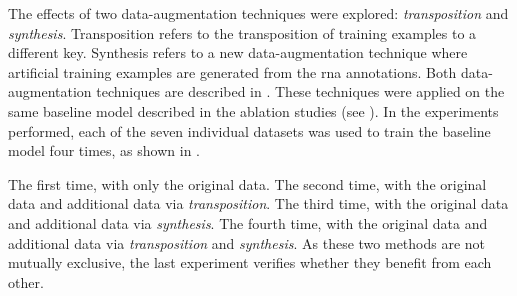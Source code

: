 
The effects of two data-augmentation techniques were
explored: \emph{transposition} and \emph{synthesis}.
Transposition refers to the transposition of training
examples to a different key. Synthesis refers to a new
data-augmentation technique where artificial training
examples are generated from the \gls{rna} annotations. Both
data-augmentation techniques are described in
. These techniques were applied on
the same baseline model described in the ablation studies
(see ). In the experiments
performed, each of the seven individual datasets was used to
train the baseline model four times, as shown in
. 


The first time, with only
the original data. The second time, with the original data
and additional data via \emph{transposition}. The third
time, with the original data and additional data via
\emph{synthesis}. The fourth time, with the original data
and additional data via \emph{transposition} and
\emph{synthesis}. As these two methods are not mutually
exclusive, the last experiment verifies whether they benefit
from each other.
